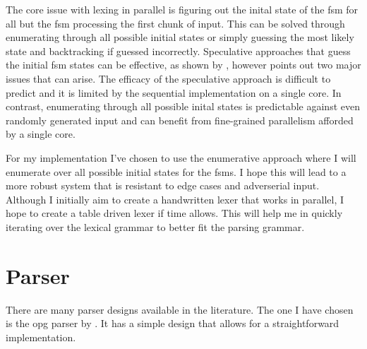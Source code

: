 The core issue with lexing in parallel is figuring out the inital state
of the \gls{fsm} for all but the \gls{fsm} processing the first chunk of
input. This can be solved through enumerating through all possible initial
states or simply guessing the most likely state and backtracking if guessed
incorrectly. Speculative approaches that guess the initial \gls{fsm} states
can be effective, as shown by \cite{luchaup_speculative_2011}, however
\cite{mytkowicz_data-parallel_2014} points out two major issues that can
arise. The efficacy of the speculative approach is difficult to predict and
it is limited by the sequential implementation on a single core. In contrast,
enumerating through all possible inital states is predictable against even
randomly generated input and can benefit from fine-grained parallelism afforded
by a single core.

For my implementation I've chosen to use the enumerative approach where I will
enumerate over all possible initial states for the \glspl{fsm}. I hope  this will
lead to a more robust system that is resistant to edge cases and adverserial
input. Although I initially aim to create a handwritten lexer that works in
parallel, I hope to create a table driven lexer if time allows. This will help
me in quickly iterating over the lexical grammar to better fit the parsing
grammar.

\section{Parser} \label{parser}

There are many parser designs available in the literature. The one I have chosen
is the \gls{opg} parser by \cite{barenghi_parallel_2015}. It has a simple design
that allows for a straightforward implementation. 

